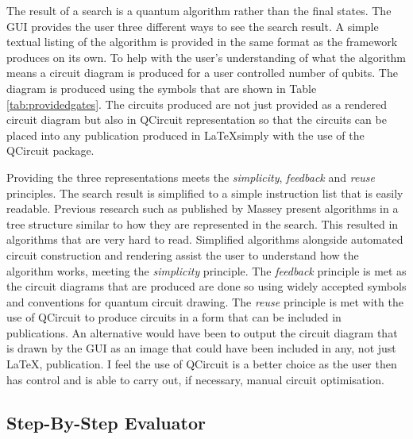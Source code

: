 The result of a search is a quantum algorithm rather than the final states.
The GUI provides the user three different ways to see the search result.
A simple textual listing of the algorithm is provided in the same format as the framework produces on its own.
To help with the user's understanding of what the algorithm means a circuit diagram is produced for a user controlled number of qubits.
The diagram is produced using the symbols that are shown in Table \ref{tab:providedgates}.
The circuits produced are not just provided as a rendered circuit diagram but also in QCircuit\cite{QCsite} representation so that the circuits can be placed into any publication produced in \LaTeX simply with the use of the QCircuit package.

Providing the three representations meets the \emph{simplicity}, \emph{feedback} and \emph{reuse} principles.
The search result is simplified to a simple instruction list that is easily readable.
Previous research such as published by Massey\cite{Massey:2005:EHQ:1068009.1068288} present algorithms in a tree structure similar to how they are represented in the search.
This resulted in algorithms that are very hard to read.
Simplified algorithms alongside automated circuit construction and rendering assist the user to understand how the algorithm works, meeting the \emph{simplicity} principle.
The \emph{feedback} principle is met as the circuit diagrams that are produced are done so using widely accepted symbols and conventions for quantum circuit drawing.
The \emph{reuse} principle is met with the use of QCircuit to produce circuits in a form that can be included in publications.
An alternative would have been to output the circuit diagram that is drawn by the GUI as an image that could have been included in any, not just \LaTeX, publication.
I feel the use of QCircuit is a better choice as the user then has control and is able to carry out, if necessary, manual circuit optimisation.

\subsection{Step-By-Step Evaluator}
\label{sec:sbse}


